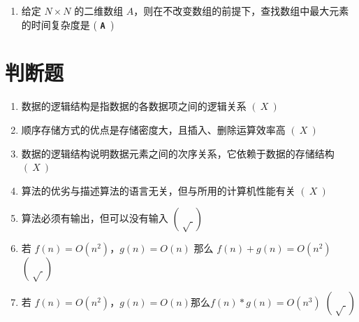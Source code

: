 \documentclass[UTF8, 12pt, a4paper, oneside]{ctexart}
\begin{document}
\begin{enumerate}
        \item 给定 $N×N$ 的二维数组 $A$，则在不改变数组的前提下，查找数组中最大元素的时间复杂度是 ( \texttt{\bf  A })
    \end{enumerate}

\section{判断题}
    \begin{enumerate}
        \item 数据的逻辑结构是指数据的各数据项之间的逻辑关系 $( \ X \ )$
        \item 顺序存储方式的优点是存储密度大，且插入、删除运算效率高 $( \ X \ )$
        \item 数据的逻辑结构说明数据元素之间的次序关系，它依赖于数据的存储结构 $( \ X \ )$
        \item 算法的优劣与描述算法的语言无关，但与所用的计算机性能有关 $( \ X \ )$
        \item 算法必须有输出，但可以没有输入 $( \ \surd \ )$
        \item 若 $f(n)=O(n^2)$，$g(n)=O(n)$ 那么 $f(n)+g(n)=O(n^2)$  $( \ \surd \ )$
        \item 若 $f(n)=O(n^2)$，$g(n)=O(n)那么 f(n)*g(n)=O(n^3)$  $(\ \surd \ )$
    \end{enumerate}
\end{document}
